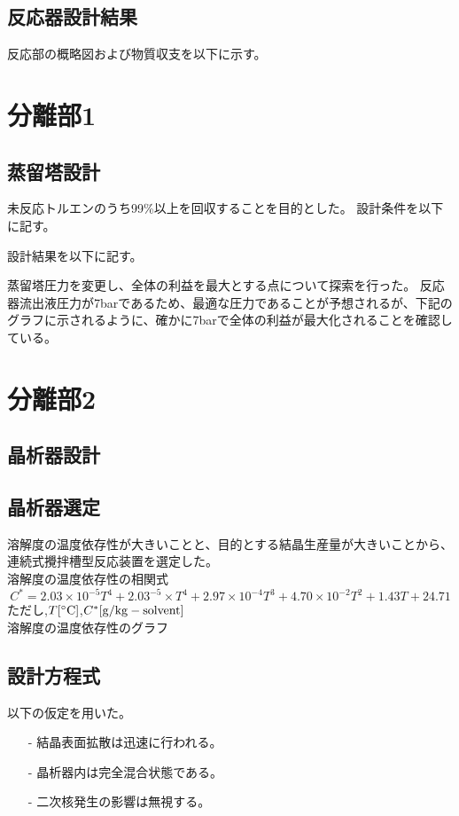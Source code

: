 \documentclass[a4j]{jsreport}
\begin{document}
\section{反応器設計結果}
反応部の概略図および物質収支を以下に示す。

\newpage
\chapter{分離部1}
\section{蒸留塔設計}
未反応トルエンのうち99\%以上を回収することを目的とした。
設計条件を以下に記す。

設計結果を以下に記す。

蒸留塔圧力を変更し、全体の利益を最大とする点について探索を行った。
反応器流出液圧力が7barであるため、最適な圧力であることが予想されるが、下記の
グラフに示されるように、確かに7barで全体の利益が最大化されることを確認している。

\newpage
\chapter{分離部2}
\section{晶析器設計}
\section{晶析器選定}
溶解度の温度依存性が大きいことと、目的とする結晶生産量が大きいことから、
連続式攪拌槽型反応装置を選定した。\\
溶解度の温度依存性の相関式
\begin{equation}
    C^*=2.03\times 10^{-5}T^4 +2.03^{-5}\times T^4 + 2.97\times 10^{-4}T^3 + 4.70\times 10^{-2}T^2
        + 1.43T + 24.71
\end{equation}
ただし,$T[{\rm ^\circ C}]$,$C^*[{\rm g/kg-solvent}]$\\
溶解度の温度依存性のグラフ


\section{設計方程式}
以下の仮定を用いた。
\begin{itemize}
    \setlength{\parskip}{0pt}
    \setlength{\itemsep}{2pt}
    \item[-] 結晶表面拡散は迅速に行われる。
    \item[-] 晶析器内は完全混合状態である。
    \item[-] 二次核発生の影響は無視する。
\end{itemize}
\end{document}
